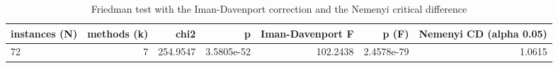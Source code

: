 \begin{table}[htbp]
\centering
\small
\caption{Friedman test with the Iman-Davenport correction and the Nemenyi critical difference}
\label{tab:E10b_state_of_the_art_60s_b60_friedman_test}
\begin{tabular}{lrrrrrr}
\toprule
instances (N) & methods (k) & chi2 & p & Iman-Davenport F & p (F) & Nemenyi CD (alpha 0.05) \\
\midrule
72 & 7 & 254.9547 & 3.5805e-52 & 102.2438 & 2.4578e-79 & 1.0615 \\
\bottomrule
\end{tabular}
\end{table}
